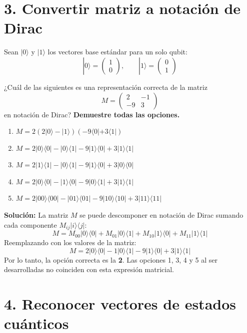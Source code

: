 \documentclass[12pt,a4paper]{article}
\begin{document}
\section{3. Convertir matriz a notación de Dirac}

Sean $|0\rangle$ y $|1\rangle$ los vectores base estándar para un solo qubit:
$$|0\rangle= \begin{pmatrix} 1\\ 0 \end{pmatrix}, \qquad |1\rangle= \begin{pmatrix} 0\\ 1 \end{pmatrix}$$

¿Cuál de las siguientes es una representación correcta de la matriz
$$M= \begin{pmatrix} 2 & -1\\ -9 & 3 \end{pmatrix}$$
en notación de Dirac? \textbf{Demuestre todas las opciones.}

\begin{enumerate}
    \item $M= 2(2|0\rangle-|1\rangle) (-9\langle0|+3\langle1|)$
    \item $M= 2|0\rangle\langle0| -|0\rangle\langle1| -9|1\rangle\langle0| +3|1\rangle\langle1|$
    \item $M= 2|1\rangle\langle1| -|0\rangle\langle1| -9|1\rangle\langle0| +3|0\rangle\langle0|$
    \item $M= 2|0\rangle\langle0| -|1\rangle\langle0| -9|0\rangle\langle1| +3|1\rangle\langle1|$
    \item $M= 2|00\rangle\langle00| -|01\rangle\langle01| -9|10\rangle\langle10| +3|11\rangle\langle11|$
\end{enumerate}

\vspace{0.5em}
\textbf{Solución:}
La matriz $M$ se puede descomponer en notación de Dirac sumando cada componente $M_{ij} |i\rangle\langle j|$:
$$M = M_{00}|0\rangle\langle0| + M_{01}|0\rangle\langle1| + M_{10}|1\rangle\langle0| + M_{11}|1\rangle\langle1|$$
Reemplazando con los valores de la matriz:
$$M = 2|0\rangle\langle0| - 1|0\rangle\langle1| - 9|1\rangle\langle0| + 3|1\rangle\langle1|$$
Por lo tanto, la opción correcta es la \textbf{2}. Las opciones 1, 3, 4 y 5 al ser desarrolladas no coinciden con esta expresión matricial.

\section{4. Reconocer vectores de estados cuánticos}
\end{document}
